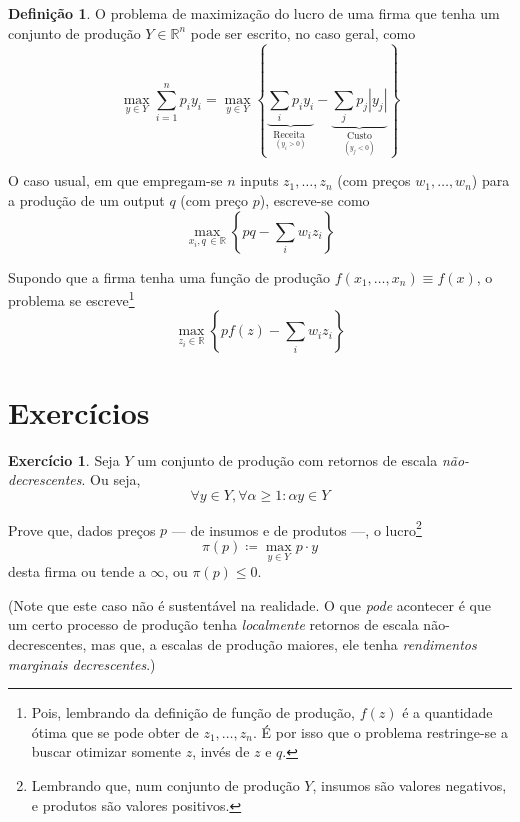 \documentclass[12pt]{article}
\numberwithin{equation}{section}
\theoremstyle{plain}
\theoremstyle{definition}
\newtheorem{definition}[theorem]{Definição}
\newtheorem{exercise}{Exercício}
\theoremstyle{remark}
\begin{document}
\begin{definition}
O problema de maximização do lucro de uma firma que tenha um conjunto de
produção \(Y \in \mathbb{R}^{n}\) pode ser escrito, no caso geral, como
\[
\max\limits_{y \in Y} \sum \limits_{i=1}^{n} p_{i}y_{i}= \max\limits_{y \in Y} \left\{\underbrace{ \sum \limits_{i} p_{i} y_{i} }_{ \underset{(y_{i} > 0)}{\text{Receita } }} - \underbrace{ \sum \limits_{j} p_{j}|y_{j}| }_{ \underset{(y_{j} < 0)}{\text{Custo}}}\right\}
\]

O caso usual, em que empregam-se \(n\) inputs \(z_{1},\dots,z_{n}\) (com
preços \(w_{1},\dots,w_{n}\)) para a produção de um output \(q\) (com
preço \(p\)), escreve-se como
\[
\max\limits_{x_{i}, q \,\in \mathbb{R}} \left\{pq - \sum \limits_{i}w_{i}z_{i}\right\}
\]

Supondo que a firma tenha uma função de produção
\(f(x_{1},\dots,x_{n}) \equiv f(x)\), o problema se escreve\footnote{Pois,
  lembrando da definição de função de produção, \(f(z)\) é a quantidade
  ótima que se pode obter de \(z_{1},\dots,z_{n}\). É por isso que o
  problema restringe-se a buscar otimizar somente \(z\), invés de \(z\)
  e \(q\).}
\[
\max\limits_{z_{i} \in \mathbb{R}} \left\{pf(z) - \sum \limits_{i}w_{i}z_{i}\right\}
\]

\end{definition}







\hypertarget{exercuxedcios}{%
\section{Exercícios}\label{exercuxedcios}}

\begin{exercise}
\parencite[, pp. 135-6]{Mas-Colell1995} Seja \(Y\) um conjunto de
produção com retornos de escala \textit{não-decrescentes}. Ou seja,
\[
\forall y \in Y, \forall \alpha\geq 1: \alpha y \in Y
\]

Prove que, dados preços \(p\) --- de insumos e de produtos ---, o
lucro\footnote{Lembrando que, num conjunto de produção \(Y\), insumos
  são valores negativos, e produtos são valores positivos.}
\[\pi(p) \coloneqq \max\limits_{y \in Y} p \cdot y\] 
desta firma ou tende a \(\infty\), ou \(\pi(p) \leq 0\).

(Note que este caso não é sustentável na realidade. O que \textit{pode} acontecer é que um certo processo de produção tenha \textit{localmente} retornos de escala não-decrescentes, mas que, a escalas de produção maiores, ele tenha \textit{rendimentos marginais decrescentes}.)
\end{exercise}
\end{document}
